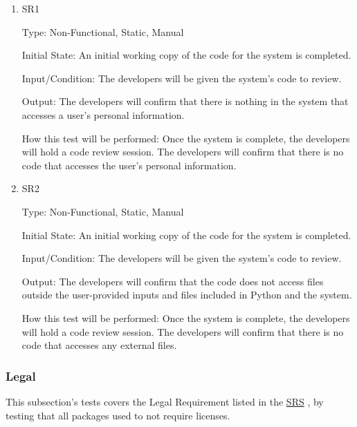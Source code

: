 \documentclass[12pt, titlepage]{article}
\begin{document}
\begin{enumerate}

\item{SR1\\}\label{SR1}

Type: Non-Functional, Static, Manual
					
Initial State: 
An initial working copy of the code for the system is completed.

Input/Condition: 
The developers will be given the system's code to review.

Output: The developers will confirm that there is nothing in the system that accesses a user's personal information.

How this test will be performed:  Once the system is complete, the developers will hold a code review session. The developers will confirm that there is no code that accesses the user's personal information.
\\
\item{SR2\\}\label{SR2}

Type: Non-Functional, Static, Manual
					
Initial State: 
An initial working copy of the code for the system is completed.

Input/Condition: 
The developers will be given the system's code to review.

Output: The developers will confirm that the code does not access files outside the user-provided inputs and files included in Python and the system.

How this test will be performed:  Once the system is complete, the developers will hold a code review session. The developers will confirm that there is no code that accesses any external files.

\end{enumerate}

\subsubsection{Legal}
This subsection's tests covers the Legal Requirement listed in the \href{https://github.com/paezha/PyERT-BLACK/blob/main/docs/SRS/SRS.pdf}{SRS} \citep{SRS}, by testing that all packages used to not require licenses.
\end{document}
